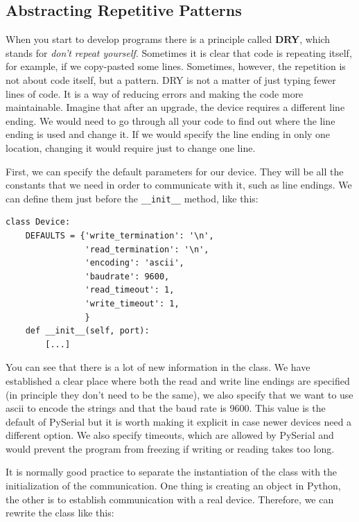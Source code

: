\subsection{Abstracting Repetitive Patterns}
When you start to develop programs there is a principle called \textbf{DRY}, which stands for \emph{don't repeat yourself}. Sometimes it is clear that code is repeating itself, for example, if we copy-pasted some lines. Sometimes, however, the repetition is not about code itself, but a pattern. {DRY} is not a matter of just typing fewer lines of code. It is a way of reducing errors and making the code more maintainable. Imagine that after an upgrade, the device requires a different line ending. We would need to go through all your code to find out where the line ending is used and change it. If we would specify the line ending in only one location, changing it would require just to change one line. 

First, we can specify the default parameters for our device. They will be all the constants that we need in order to communicate with it, such as line endings. We can define them just before the \texttt{__init__} method, like this:

\begin{verbatim}
class Device:
    DEFAULTS = {'write_termination': '\n',
                'read_termination': '\n',
                'encoding': 'ascii',
                'baudrate': 9600,
                'read_timeout': 1,
                'write_timeout': 1,
                }
    def __init__(self, port):
        [...]
\end{verbatim}

You can see that there is a lot of new information in the class. We have established a clear place where both the read and write line endings are specified (in principle they don't need to be the same), we also specify that we want to use ascii to encode the strings and that the baud rate is 9600. This value is the default of PySerial but it is worth making it explicit in case newer devices need a different option. We also specify timeouts, which are allowed by PySerial and would prevent the program from freezing if writing or reading takes too long. 

It is normally good practice to separate the instantiation of the class with the initialization of the communication. One thing is creating an object in Python, the other is to establish communication with a real device. Therefore, we can rewrite the class like this:

